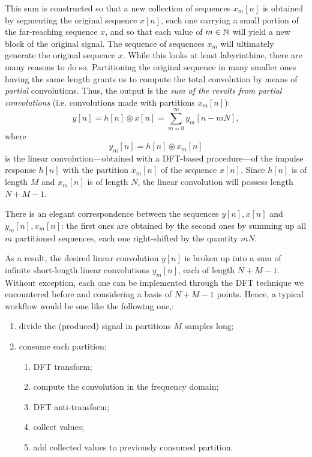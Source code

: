 \documentclass[\documentfontsize, twocolumn]{\classname}
\begin{document}
This sum is constructed so that a new collection of sequences $x_m[n]$ is obtained by segmenting the original sequence $x[n]$, each one carrying a small portion of the far-reaching sequence $x$, and so that each value of $m \in \mathbb N$ will yield a new block of the original signal. The sequence of sequences $x_m$ will ultimately generate the original sequence $x$. While this looks at least labyrinthine, there are many reasons to do so. Partitioning the original sequence in many smaller ones having the same length grants us to compute the total convolution by means of \emph{partial} convolutions. Thus, the output is the \emph{sum of the results from partial convolutions} (i.e. convolutions made with partitions $x_m[n]$):
\begin{equation}\label{eqn:overlapAddMethod}
    y[n] = h[n] \circledast x[n] = \sum_{m=0}^\infty y_m[n - mN],
\end{equation}
where \[y_m[n] = h[n] \circledast x_m[n]\] is the linear con\-vo\-lu\-tion---ob\-tai\-ned with a DFT-based pro\-ce\-du\-re---of the impulse response $h[n]$ with the partition $x_m[n]$ of the sequence $x[n]$. Since $h[n]$ is of length $M$ and $x_m[n]$ is of length $N$, the linear convolution will possess length $N + M - 1$.

There is an elegant correspondence between the sequences $y[n], x[n]$ and $y_m[n], x_m[n]$: the first ones are obtained by the second ones by summing up all $m$ partitioned sequences, each one right-shifted by the quantity $mN$.

As a result, the desired linear convolution $y[n]$ is broken up into a sum of infinite short-length linear convolutions $y_m[n]$, each of length $N + M - 1$. Without exception, each one can be implemented through the DFT technique we encountered before and considering a basis of $N + M - 1$ points. Hence, a typical workflow would be one like the following one,:
\begin{enumerate}
    \item divide the (produced) signal in partitions $M$ samples long;
    \item consume each partition:
    \begin{enumerate}
        \item DFT transform;
        \item compute the convolution in the frequency domain;
        \item DFT anti-transform;
        \item collect values;
        \item add collected values to previously consumed partition.
    \end{enumerate}
\end{enumerate}
\end{document}
